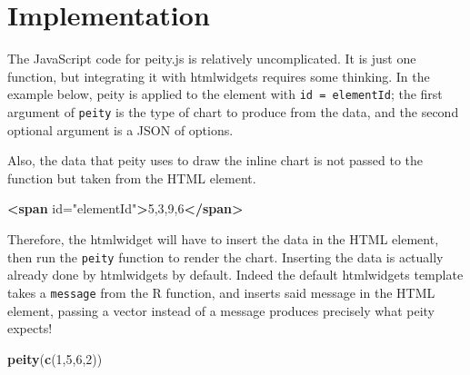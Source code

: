 \documentclass[10pt,]{krantz}
\makeatletter
\newenvironment{Shaded}{\begin{snugshade}}{\end{snugshade}}
\newcommand{\AttributeTok}[1]{\textcolor[rgb]{0.61,0.61,0.61}{#1}}
\newcommand{\DataTypeTok}[1]{\textcolor[rgb]{0.27,0.27,0.27}{#1}}
\newcommand{\DecValTok}[1]{\textcolor[rgb]{0.06,0.06,0.06}{#1}}
\newcommand{\KeywordTok}[1]{\textcolor[rgb]{0.27,0.27,0.27}{\textbf{#1}}}
\newcommand{\NormalTok}[1]{#1}
\newcommand{\OperatorTok}[1]{\textcolor[rgb]{0.43,0.43,0.43}{\textbf{#1}}}
\newcommand{\OtherTok}[1]{\textcolor[rgb]{0.37,0.37,0.37}{#1}}
\newcommand{\StringTok}[1]{\textcolor[rgb]{0.5,0.5,0.5}{#1}}
\newenvironment{kframe}{%
\medskip{}
\setlength{\fboxsep}{.8em}
 \def\at@end@of@kframe{}%
 \ifinner\ifhmode%
  \def\at@end@of@kframe{\end{minipage}}%
  \begin{minipage}{\columnwidth}%
 \fi\fi%
 \def\FrameCommand##1{\hskip\@totalleftmargin \hskip-\fboxsep
 \colorbox{shadecolor}{##1}\hskip-\fboxsep
     \hskip-\linewidth \hskip-\@totalleftmargin \hskip\columnwidth}%
 \MakeFramed {\advance\hsize-\width
   \@totalleftmargin\z@ \linewidth\hsize
   \@setminipage}}%
 {\par\unskip\endMakeFramed%
 \at@end@of@kframe}
\renewenvironment{Shaded}{\begin{kframe}}{\end{kframe}}
\makeatother
\begin{document}
\hypertarget{widgets-realistic-implementation}{%
\section{Implementation}\label{widgets-realistic-implementation}}

The JavaScript code for peity.js is relatively uncomplicated. It is just one function, but integrating it with htmlwidgets requires some thinking. In the example below, peity is applied to the element with \texttt{id\ =\ \textquotesingle{}elementId\textquotesingle{}}; the first argument of \texttt{peity} is the type of chart to produce from the data, and the second optional argument is a JSON of options.

\begin{Shaded}
\end{Shaded}

Also, the data that peity uses to draw the inline chart is not passed to the function but taken from the HTML element.

\begin{Shaded}
\begin{Highlighting}[]
\KeywordTok{<span}\OtherTok{ id=}\StringTok{"elementId"}\KeywordTok{>}\NormalTok{5,3,9,6}\KeywordTok{</span>}
\end{Highlighting}
\end{Shaded}

Therefore, the htmlwidget will have to insert the data in the HTML element, then run the \texttt{peity} function to render the chart. Inserting the data is actually already done by htmlwidgets by default. Indeed the default htmlwidgets template takes a \texttt{message} from the R function, and inserts said message in the HTML element, passing a vector instead of a message produces precisely what peity expects!

\begin{Shaded}
\begin{Highlighting}[]
\KeywordTok{peity}\NormalTok{(}\KeywordTok{c}\NormalTok{(}\DecValTok{1}\NormalTok{,}\DecValTok{5}\NormalTok{,}\DecValTok{6}\NormalTok{,}\DecValTok{2}\NormalTok{))}
\end{Highlighting}
\end{Shaded}
\end{document}
